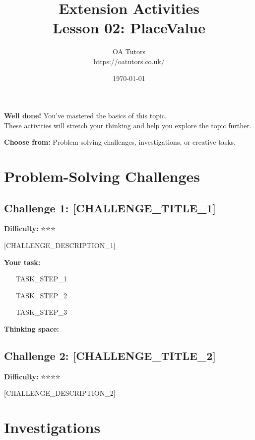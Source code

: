 \documentclass[a4paper,12pt]{article}
\begin{document}
\title{\textcolor{oagreen}{\Huge Extension Activities} \\ 
       \textcolor{oablue}{\Large Lesson 02: PlaceValue}}
\author{\textcolor{oablue}{OA Tutors} \\ 
        \textcolor{oagray}{https://oatutors.co.uk/}}
\date{\textcolor{oagray}{\today}}

\maketitle

\begin{challenge}
\textbf{Well done!} You've mastered the basics of this topic. \\
These activities will stretch your thinking and help you explore the topic further.

\textbf{Choose from:} Problem-solving challenges, investigations, or creative tasks.
\end{challenge}

\section{Problem-Solving Challenges}

\subsection{Challenge 1: [CHALLENGE_TITLE_1]}
\textbf{Difficulty:} ⭐⭐⭐

[CHALLENGE_DESCRIPTION_1]

\textbf{Your task:}
\begin{enumerate}
    \item [TASK_STEP_1]
    \item [TASK_STEP_2]
    \item [TASK_STEP_3]
\end{enumerate}

\textbf{Thinking space:}

\vspace{4cm}

\subsection{Challenge 2: [CHALLENGE_TITLE_2]}
\textbf{Difficulty:} ⭐⭐⭐⭐

[CHALLENGE_DESCRIPTION_2]

\vspace{4cm}

\section{Investigations}
\end{document}
